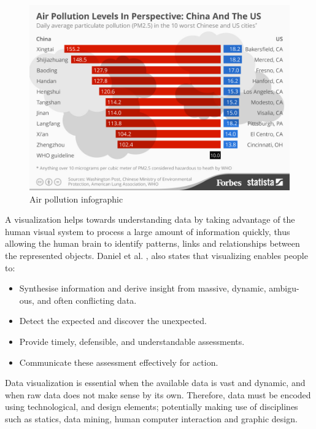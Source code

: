 \begin{figure}[h]
  \centering
  \begin{adjustbox}{width=.8\textwidth,center=\textwidth}
  \includegraphics[scale=1]{images/air_pollution_infographic.jpg}
  \end{adjustbox}
  \caption[Air pollution infographic]{Air pollution infographic \cite{NiallMcCarthy}}
  \label{fig:air_pollution_infographic}
\end{figure}

A visualization helps towards understanding data  by taking advantage of the human visual system to process a large amount of information quickly, thus allowing the human brain to identify patterns, links and relationships between the represented objects. Daniel et al. \cite{KeimDaniel2010}, also states that visualizing enables people to: 
\begin{displayquote}
	\begin{itemize}
\item  Synthesise information and derive insight from massive, dynamic, ambigu- ous, and often conflicting data.
\item Detect the expected and discover the unexpected.
\item Provide timely, defensible, and understandable assessments.
\item Communicate these assessment effectively for action.
	\end{itemize}
\end{displayquote}

Data visualization is essential when the available data is vast and dynamic, and when raw data does not make sense by its own. Therefore, data must be encoded using technological, and design elements;  potentially making use of disciplines such as statics, data mining, human computer interaction and graphic design. 

